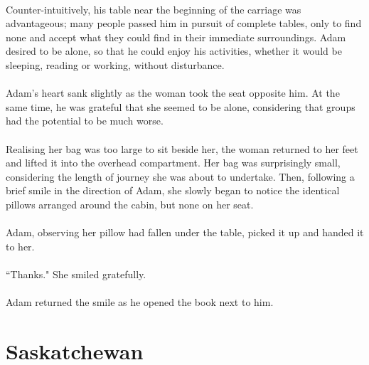 \documentclass{article}
\begin{document}
\paragraph{}
Counter-intuitively, his table near the beginning of the carriage was advantageous; many people passed him in pursuit of complete tables, only to find none and accept what they could find in their immediate surroundings. Adam desired to be alone, so that he could enjoy his activities, whether it would be sleeping, reading or working, without disturbance.

\paragraph{}
Adam's heart sank slightly as the woman took the seat opposite him. At the same time, he was grateful that she seemed to be alone, considering that groups had the potential to be much worse.

\paragraph{}
Realising her bag was too large to sit beside her, the woman returned to her feet and lifted it into the overhead compartment. Her bag was surprisingly small, considering the length of journey she was about to undertake. Then, following a brief smile in the direction of Adam, she slowly began to notice the identical pillows arranged around the cabin, but none on her seat.

\paragraph{}
Adam, observing her pillow had fallen under the table, picked it up and handed it to her.

\paragraph{}
``Thanks." She smiled gratefully.

\paragraph{}
Adam returned the smile as he opened the book next to him.

\section{Saskatchewan}
\end{document}
